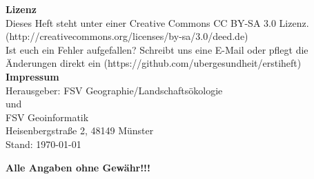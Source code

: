 \begin{center}
\begin{small}
 \textbf{Lizenz} \\ \medskip
Dieses Heft steht unter einer Creative Commons CC BY-SA 3.0 Lizenz. (http://creativecommons.org/licenses/by-sa/3.0/deed.de)\\ \smallskip
Ist euch ein Fehler aufgefallen? Schreibt uns eine E-Mail oder pflegt die Änderungen direkt ein (https://github.com/ubergesundheit/erstiheft)\\ \bigskip
 \textbf{Impressum} \\ \medskip
Herausgeber: FSV Geographie/Landschaftsökologie\\
und\\
FSV Geoinformatik\\
Heisenbergstraße 2, 48149 Münster\\ \medskip
Stand: \today\mbox{ }\currenttime\\ \medskip
\end{small}
\begin{tiny}
\sffamily
\textbf{Alle Angaben ohne Gewähr!!!}
\end{tiny}
\end{center}
